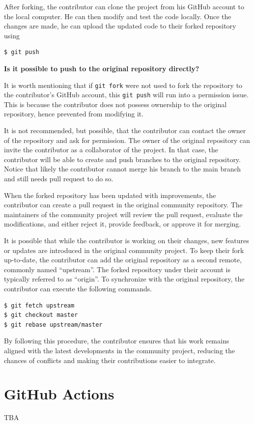 After forking, the contributor can clone the project from his GitHub account to the local computer. He can then modify and test the code locally. Once the changes are made, he can upload the updated code to their forked repository using
\begin{lstlisting}
$ git push
\end{lstlisting}

\begin{mdframed}
\textbf{Is it possible to push to the original repository directly?}

It is worth mentioning that if \verb|git fork| were not used to fork the repository to the contributor's GitHub account, this \verb|git push| will run into a permission issue. This is because the contributor does not possess ownership to the original repository, hence prevented from modifying it.

It is not recommended, but possible, that the contributor can contact the owner of the repository and ask for permission. The owner of the original repository can invite the contributor as a collaborator of the project. In that case, the contributor will be able to create and push branches to the original repository. Notice that likely the contributor cannot merge his branch to the main branch and still needs pull request to do so.

\end{mdframed}

When the forked repository has been updated with improvements, the contributor can create a pull request in the original community repository. The maintainers of the community project will review the pull request, evaluate the modifications, and either reject it, provide feedback, or approve it for merging.

It is possible that while the contributor is working on their changes, new features or updates are introduced in the original community project. To keep their fork up-to-date, the contributor can add the original repository as a second remote, commonly named ``upstream''. The forked repository under their account is typically referred to as ``origin''. To synchronize with the original repository, the contributor can execute the following commands.
\begin{lstlisting}
$ git fetch upstream
$ git checkout master
$ git rebase upstream/master
\end{lstlisting}

By following this procedure, the contributor ensures that his work remains aligned with the latest developments in the community project, reducing the chances of conflicts and making their contributions easier to integrate.

\section{GitHub Actions}

TBA
